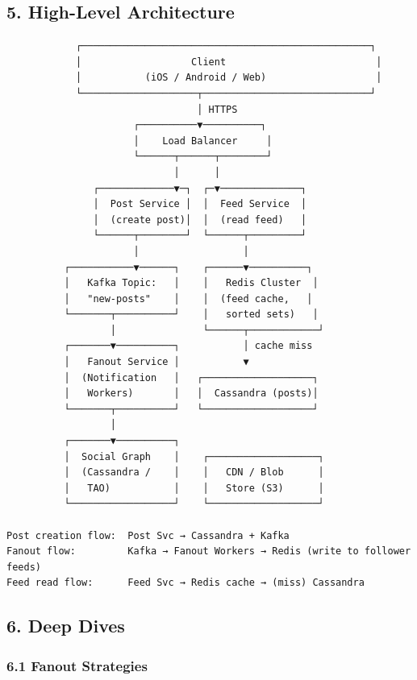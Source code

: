 \documentclass[11pt]{article}
\begin{document}
\subsection{5. High-Level Architecture}\label{5-high-level-architecture-2}

\setcodelang{}

\begin{verbatim}
            ┌──────────────────────────────────────────────────┐
            │                   Client                          │
            │           (iOS / Android / Web)                   │
            └────────────────────┬─────────────────────────────┘
                                 │ HTTPS
                      ┌──────────▼──────────┐
                      │    Load Balancer     │
                      └──────┬──────┬────────┘
                             │      │
               ┌─────────────▼─┐  ┌─▼──────────────┐
               │  Post Service │  │  Feed Service  │
               │  (create post)│  │  (read feed)   │
               └──────┬────────┘  └──────┬─────────┘
                      │                  │
          ┌───────────▼──────┐    ┌──────▼──────────┐
          │   Kafka Topic:   │    │   Redis Cluster  │
          │   "new-posts"    │    │  (feed cache,   │
          └───────┬──────────┘    │   sorted sets)   │
                  │               └──────┬────────────┘
          ┌───────▼──────────┐           │ cache miss
          │   Fanout Service │           ▼
          │  (Notification   │   ┌───────────────────┐
          │   Workers)       │   │  Cassandra (posts)│
          └───────┬──────────┘   └───────────────────┘
                  │
          ┌───────▼──────────┐
          │  Social Graph    │    ┌───────────────────┐
          │  (Cassandra /    │    │   CDN / Blob      │
          │   TAO)           │    │   Store (S3)      │
          └──────────────────┘    └───────────────────┘

Post creation flow:  Post Svc → Cassandra + Kafka
Fanout flow:         Kafka → Fanout Workers → Redis (write to follower feeds)
Feed read flow:      Feed Svc → Redis cache → (miss) Cassandra
\end{verbatim}

\subsection{6. Deep Dives}\label{6-deep-dives-2}

\subsubsection{6.1 Fanout Strategies}\label{61-fanout-strategies}
\end{document}
